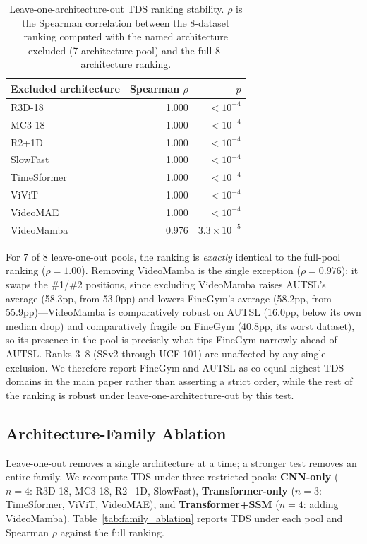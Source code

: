 \documentclass[a4paper, 10pt, conference, onecolumn]{ieeeconf}
\newcommand{\tabtight}{\setlength{\tabcolsep}{3.5pt}\renewcommand{\arraystretch}{1.12}}
\newcommand{\TDS}{\textsc{TDS}}
\begin{document}
\begin{table}[!htbp]
\centering
\caption{Leave-one-architecture-out \TDS{} ranking stability. $\rho$ is the Spearman correlation between the 8-dataset ranking computed with the named architecture excluded (7-architecture pool) and the full 8-architecture ranking.}
\label{tab:loo_tds}
\scriptsize\tabtight
\begin{tabular}{l r r}
\toprule
Excluded architecture & Spearman $\rho$ & $p$ \\
\midrule
R3D-18       & 1.000 & $<10^{-4}$ \\
MC3-18       & 1.000 & $<10^{-4}$ \\
R2+1D        & 1.000 & $<10^{-4}$ \\
SlowFast     & 1.000 & $<10^{-4}$ \\
TimeSformer  & 1.000 & $<10^{-4}$ \\
ViViT        & 1.000 & $<10^{-4}$ \\
VideoMAE     & 1.000 & $<10^{-4}$ \\
VideoMamba   & 0.976 & $3.3\times10^{-5}$ \\
\bottomrule
\end{tabular}
\end{table}

For 7 of 8 leave-one-out pools, the ranking is \emph{exactly} identical to the full-pool ranking ($\rho=1.00$). Removing VideoMamba is the single exception ($\rho=0.976$): it swaps the \#1/\#2 positions, since excluding VideoMamba raises AUTSL's average (58.3pp, from 53.0pp) and lowers FineGym's average (58.2pp, from 55.9pp)---VideoMamba is comparatively robust on AUTSL (16.0pp, below its own median drop) and comparatively fragile on FineGym (40.8pp, its worst dataset), so its presence in the pool is precisely what tips FineGym narrowly ahead of AUTSL. Ranks 3--8 (SSv2 through UCF-101) are unaffected by any single exclusion. We therefore report FineGym and AUTSL as co-equal highest-\TDS{} domains in the main paper rather than asserting a strict order, while the rest of the ranking is robust under leave-one-architecture-out by this test.

\subsection{Architecture-Family Ablation}
\label{sec:sup_family_ablation}

Leave-one-out removes a single architecture at a time; a stronger test removes an entire family. We recompute \TDS{} under three restricted pools: \textbf{CNN-only} ($n{=}4$: R3D-18, MC3-18, R2+1D, SlowFast), \textbf{Transformer-only} ($n{=}3$: TimeSformer, ViViT, VideoMAE), and \textbf{Transformer+SSM} ($n{=}4$: adding VideoMamba). Table~\ref{tab:family_ablation} reports \TDS{} under each pool and Spearman $\rho$ against the full ranking.
\end{document}
